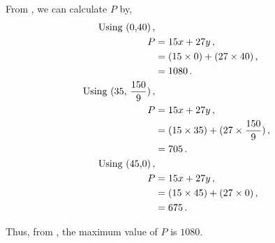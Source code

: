 \begin{subquestions}

\subquestion

From , we can calculate $P$ by,
\begin{align}
	\text{Using (0,40)} \,, \nonumber \\
	P & = 15x + 27y \,, \nonumber \\
	  & = (15 \times 0) + (27 \times 40) \,, \nonumber \\
	  & = 1080 \,. \label{2008:q1:eqn:Profit} \\
	\text{Using (35, $\frac{150}{9})$} \,, \nonumber \\
	P & = 15x + 27y \,, \nonumber \\
	  & = (15 \times 35) + (27 \times \frac{150}{9}) \,, \nonumber \\
	  & = 705 \,.    \\		  
	\text{Using (45,0)} \,, \nonumber \\
	P & = 15x + 27y \,, \nonumber \\
	  & = (15 \times 45) + (27 \times 0) \,, \nonumber \\
	  & = 675 \,. 
\end{align}

Thus, from , the maximum value of $P$ is $1080$.

\end{subquestions}


